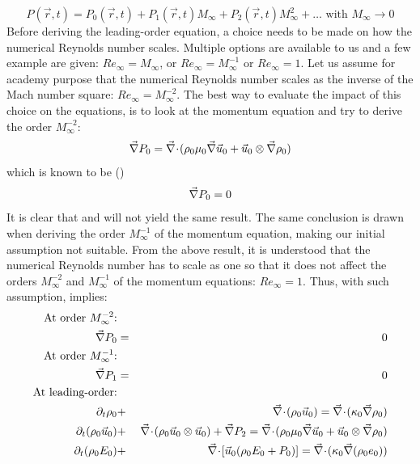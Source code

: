 \begin{equation}
\label{eq:expansion}
P(\vec{r}, t) = P_0(\vec{r}, t) + P_1(\vec{r}, t) M_{\infty} + P_2(\vec{r}, t) M_{\infty}^2 + \dots \text{ with } M_{\infty} \to 0
\end{equation}
Before deriving the leading-order equation, a choice needs to be made on how the numerical Reynolds number scales. Multiple options are available to us and a few example are given: $Re_{\infty} = M_{\infty}$, or $Re_{\infty} = M_{\infty}^{-1}$ or $Re_{\infty} = 1$. Let us assume for academy purpose that the numerical Reynolds number scales as the inverse of the Mach number square:  $Re_{\infty} = M_{\infty}^{-2}$. The best way to evaluate the impact of this choice on the equations, is to look at the momentum equation and try to derive the order $M_{\infty}^{-2}$:
\begin{equation}
\label{eq:mom_leading_wrong}
\vec{\nabla} P_0 = \vec{\nabla}\! \cdot \! (\rho_0 \mu_0 \vec{\nabla} \vec{u}_0 + \vec{u}_0 \otimes \vec{\nabla} \rho_0 )
\end{equation}
which is known to be (\cite{LowMach3})
\begin{equation}
\label{eq:mom_leading_right}
\vec{\nabla} P_0 = 0 
\end{equation}
It is clear that  and  will not yield the same result. The same conclusion is drawn when deriving the order $M_{\infty}^{-1}$ of the momentum equation, making our initial assumption not suitable. From the above result, it is understood that the numerical Reynolds number has to scale as one so that it does not affect the orders $M_{\infty}^{-2}$ and $M_{\infty}^{-1}$ of the momentum equations: $Re_{\infty} = 1$. Thus, with such assumption,  implies:
 \begin{eqnarray}
 \text{At order $M_{\infty}^{-2}$:} \nonumber\\
 \grad P_0 &=& 0  \nonumber\\
 \text{At order $M_{\infty}^{-1}$:} \nonumber\\
 \grad P_1 &=& 0  \nonumber \\
 \text{At leading-order:} \nonumber\\
 \partial_t \rho_0 &+& \div ( \rho_0 \vec{u}_0 ) = \div ( \kappa_0 \grad \rho_0 ) \nonumber \\
 \partial_t (\rho_0 \vec{u}_0) &+& \div ( \rho_0 \vec{u}_0 \otimes \vec{u}_0) + \grad P_2 = \div (\rho_0 \mu_0 \grad \vec{u}_0 + \vec{u}_0 \otimes \grad \rho_0 ) \nonumber \\
 \partial_t(\rho_0 E_0) &+& \div \left[ \vec{u}_0 (\rho_0 E_0 + P_0) \right] = \div(\kappa_0 \grad(\rho_0 e_0)) \nonumber
 \end{eqnarray}
